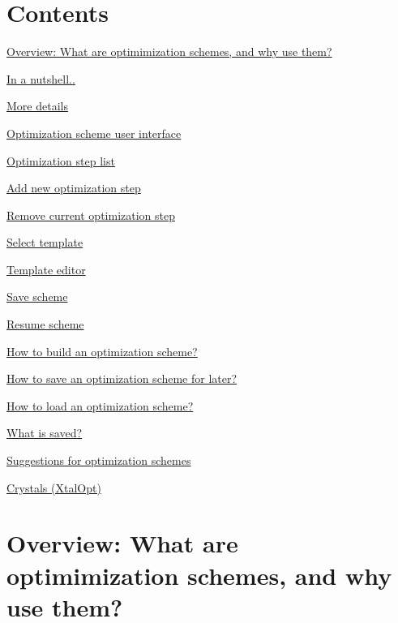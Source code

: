 \hypertarget{tut-xo_Contents}{}\section{Contents}\label{tut-xo_Contents}

\begin{DoxyItemize}
\item \hyperlink{optschemes_overview}{Overview\+: What are optimimization schemes, and why use them?}
\begin{DoxyItemize}
\item \hyperlink{optschemes_quick-over}{In a nutshell..}
\item \hyperlink{optschemes_detailed-over}{More details}
\end{DoxyItemize}
\item \hyperlink{optschemes_gui}{Optimization scheme user interface}
\begin{DoxyItemize}
\item \hyperlink{optschemes_gui-list}{Optimization step list}
\item \hyperlink{optschemes_gui-add}{Add new optimization step}
\item \hyperlink{optschemes_gui-rem}{Remove current optimization step}
\item \hyperlink{optschemes_gui-tselect}{Select template}
\item \hyperlink{optschemes_gui-editor}{Template editor}
\item \hyperlink{optschemes_gui-save}{Save scheme}
\item \hyperlink{optschemes_gui-load}{Resume scheme}
\end{DoxyItemize}
\item \hyperlink{optschemes_creating}{How to build an optimization scheme?}
\item \hyperlink{optschemes_saving}{How to save an optimization scheme for later?}
\item \hyperlink{optschemes_loading}{How to load an optimization scheme?}
\item \hyperlink{optschemes_format}{What is saved?}
\item \hyperlink{optschemes_suggest}{Suggestions for optimization schemes}
\begin{DoxyItemize}
\item \hyperlink{optschemes_sug-xtal}{Crystals (Xtal\+Opt)}
\end{DoxyItemize}
\end{DoxyItemize}\hypertarget{optschemes_overview}{}\section{Overview\+: What are optimimization schemes, and why use them?}\label{optschemes_overview}
